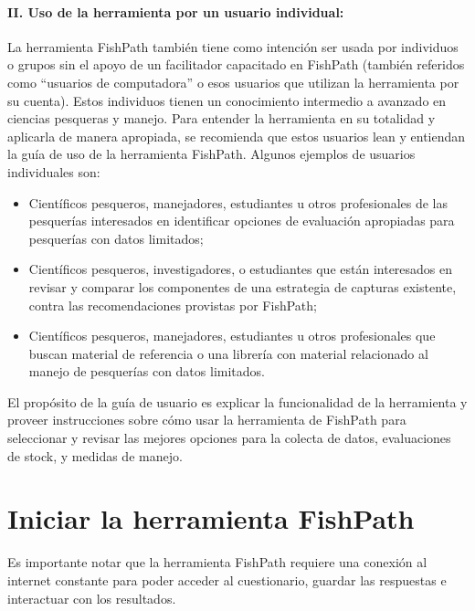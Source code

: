 \documentclass[
  11pt,
]{book}
\providecommand{\tightlist}{%
  \setlength{\itemsep}{0pt}\setlength{\parskip}{0pt}}
\begin{document}
\hypertarget{ii.-uso-de-la-herramienta-por-un-usuario-individual}{%
\subsubsection{II. Uso de la herramienta por un usuario individual:}\label{ii.-uso-de-la-herramienta-por-un-usuario-individual}}

La herramienta FishPath también tiene como intención ser usada por individuos o grupos sin el apoyo de un facilitador capacitado en FishPath (también referidos como ``usuarios de computadora'' o esos usuarios que utilizan la herramienta por su cuenta). Estos individuos tienen un conocimiento intermedio a avanzado en ciencias pesqueras y manejo. Para entender la herramienta en su totalidad y aplicarla de manera apropiada, se recomienda que estos usuarios lean y entiendan la guía de uso de la herramienta FishPath. Algunos ejemplos de usuarios individuales son:

\begin{itemize}
\tightlist
\item
  Científicos pesqueros, manejadores, estudiantes u otros profesionales de las pesquerías interesados en identificar opciones de evaluación apropiadas para pesquerías con datos limitados;
\item
  Científicos pesqueros, investigadores, o estudiantes que están interesados en revisar y comparar los componentes de una estrategia de capturas existente, contra las recomendaciones provistas por FishPath;
\item
  Científicos pesqueros, manejadores, estudiantes u otros profesionales que buscan material de referencia o una librería con material relacionado al manejo de pesquerías con datos limitados.
\end{itemize}

El propósito de la guía de usuario es explicar la funcionalidad de la herramienta y proveer instrucciones sobre cómo usar la herramienta de FishPath para seleccionar y revisar las mejores opciones para la colecta de datos, evaluaciones de stock, y medidas de manejo.

\hypertarget{iniciar-la-herramienta-fishpath}{%
\chapter{Iniciar la herramienta FishPath}\label{iniciar-la-herramienta-fishpath}}

Es importante notar que la herramienta FishPath requiere una conexión al internet constante para poder acceder al cuestionario, guardar las respuestas e interactuar con los resultados.
\end{document}
